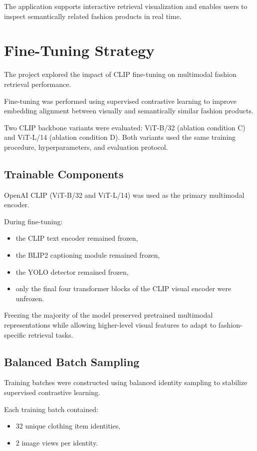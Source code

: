 \documentclass[11pt,a4paper]{article}
\begin{document}
The application supports interactive retrieval visualization and enables users to inspect semantically related fashion products in real time.

\section{Fine-Tuning Strategy}

The project explored the impact of CLIP fine-tuning on multimodal fashion retrieval performance.

Fine-tuning was performed using supervised contrastive learning to improve embedding alignment between visually and semantically similar fashion products.

Two CLIP backbone variants were evaluated: ViT-B/32 (ablation condition C) and ViT-L/14 (ablation condition D). Both variants used the same training procedure, hyperparameters, and evaluation protocol.

\subsection{Trainable Components}

OpenAI CLIP (ViT-B/32 and ViT-L/14) was used as the primary multimodal encoder.

During fine-tuning:
\begin{itemize}
    \item the CLIP text encoder remained frozen,
    \item the BLIP2 captioning module remained frozen,
    \item the YOLO detector remained frozen,
    \item only the final four transformer blocks of the CLIP visual encoder were unfrozen.
\end{itemize}

Freezing the majority of the model preserved pretrained multimodal representations while allowing higher-level visual features to adapt to fashion-specific retrieval tasks.

\subsection{Balanced Batch Sampling}

Training batches were constructed using balanced identity sampling to stabilize supervised contrastive learning.

Each training batch contained:
\begin{itemize}
    \item 32 unique clothing item identities,
    \item 2 image views per identity.
\end{itemize}
\end{document}
